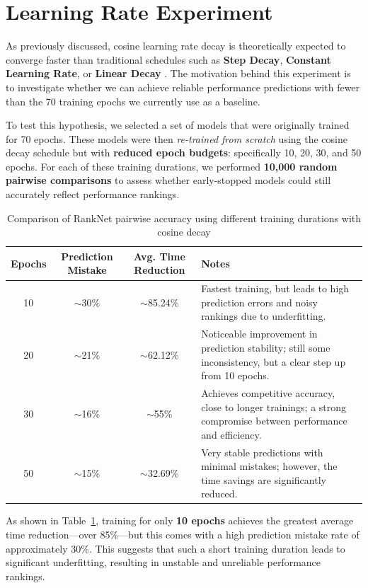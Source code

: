 \clearpage

\section{Learning Rate Experiment}

As previously discussed, cosine learning rate decay is theoretically expected to converge faster than traditional schedules such as \textbf{Step Decay}, \textbf{Constant Learning Rate}, or \textbf{Linear Decay} \cite{li2019exponential}  \cite{kim2021automated}. The motivation behind this experiment is to investigate whether we can achieve reliable performance predictions with fewer than the 70 training epochs we currently use as a baseline.

To test this hypothesis, we selected a set of models that were originally trained for 70 epochs. These models were then \textit{re-trained from scratch} using the cosine decay schedule but with \textbf{reduced epoch budgets}: specifically 10, 20, 30, and 50 epochs. For each of these training durations, we performed \textbf{10,000 random pairwise comparisons} to assess whether early-stopped models could still accurately reflect performance rankings.


\begin{table}[ht]
\centering
\begin{tabular}{|c|c|c|p{6cm}|}
\hline
\textbf{Epochs} & \textbf{Prediction Mistake} & \textbf{Avg. Time Reduction} & \textbf{Notes} \\
\hline
10 & $\sim$30\% & $\sim$85.24\% & Fastest training, but leads to high prediction errors and noisy rankings due to underfitting. \\
20 & $\sim$21\% & $\sim$62.12\% & Noticeable improvement in prediction stability; still some inconsistency, but a clear step up from 10 epochs. \\
30 & $\sim$16\% & $\sim$55\% & Achieves competitive accuracy, close to longer trainings; a strong compromise between performance and efficiency. \\
50 & $\sim$15\% & $\sim$32.69\% & Very stable predictions with minimal mistakes; however, the time savings are significantly reduced. \\
\hline
\end{tabular}
\caption{Comparison of RankNet pairwise accuracy using different training durations with cosine decay}
\label{tab:cosine_decay_results}
\end{table}


As shown in Table~\ref{tab:cosine_decay_results}, training for only \textbf{10 epochs} achieves the greatest average time reduction—over 85\%—but this comes with a high prediction mistake rate of approximately 30\%. This suggests that such a short training duration leads to significant underfitting, resulting in unstable and unreliable performance rankings.


